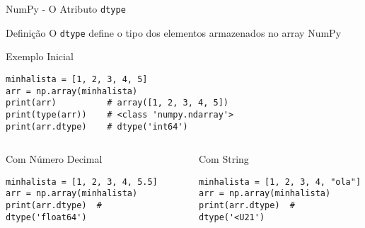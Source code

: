 \begin{frame}[fragile]{NumPy - O Atributo \texttt{dtype}}

\begin{block}{Definição}
O \texttt{dtype} define o tipo dos elementos armazenados no array NumPy
\end{block}

\begin{exampleblock}{Exemplo Inicial}
\begin{verbatim}
minhalista = [1, 2, 3, 4, 5]
arr = np.array(minhalista)
print(arr)          # array([1, 2, 3, 4, 5])
print(type(arr))    # <class 'numpy.ndarray'>
print(arr.dtype)    # dtype('int64')
\end{verbatim}
\end{exampleblock}

\begin{columns}[T]
    \begin{column}{0.5\textwidth}
        \begin{alertblock}{Com Número Decimal}
\begin{verbatim}
minhalista = [1, 2, 3, 4, 5.5]
arr = np.array(minhalista)
print(arr.dtype)  # dtype('float64')
\end{verbatim}
        \end{alertblock}
    \end{column}
    
    \begin{column}{0.5\textwidth}
        \begin{alertblock}{Com String}
\begin{verbatim}
minhalista = [1, 2, 3, 4, "ola"]
arr = np.array(minhalista)
print(arr.dtype)  # dtype('<U21')
\end{verbatim}
        \end{alertblock}
    \end{column}
\end{columns}


\end{frame}



